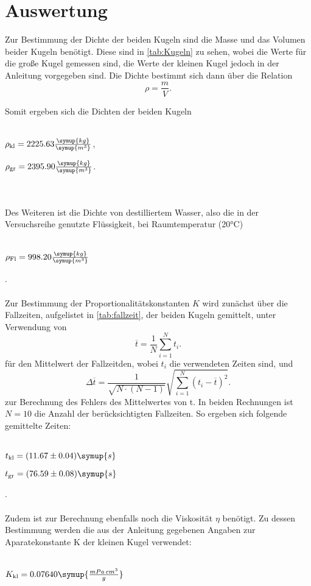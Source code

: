 \section{Auswertung}
\label{sec:Auswertung}
Zur Bestimmung der Dichte der beiden Kugeln sind die Masse und das Volumen beider Kugeln benötigt. Diese sind in \autoref{tab:Kugeln}
zu sehen, wobei die Werte für die große Kugel gemessen sind, die Werte der kleinen Kugel jedoch in der Anleitung \cite{V207} vorgegeben sind.
 Die Dichte bestimmt sich dann über die Relation
\begin{equation}
\rho = \frac{m}{V}.
\end{equation}

Somit ergeben sich die Dichten der beiden Kugeln
\\ \\
\centerline{$\rho_\text{kl} = 2225.63 \frac{\symup{kg}}{\symup{m^3}}$,}
\centerline{$\rho_\text{gr} = 2395.90 \frac{\symup{kg}}{\symup{m^3}}$.}
\\ \\

Des Weiteren ist die Dichte von destilliertem Wasser, also die in der Versuchsreihe genutzte Flüssigkeit, bei Raumtemperatur (20°C) \cite{science}
\\ \\
\centerline{$\rho_\text{Fl} = 998.20 \frac{\symup{kg}}{\symup{m^3}}$}.
\\ \\

Zur Bestimmung der Proportionalitätskonstanten $K$ wird zunächst über die Fallzeiten, aufgelistet in \autoref{tab:fallzeit}, 
der beiden Kugeln gemittelt, unter Verwendung von 
\begin{equation}
\label{eqn:mittelwert}
\overline{t} = \frac {1} {N} \sum_{i=1}^{N} t_i.
\end{equation}
für den Mittelwert der Fallzeitden, wobei $t_i$ die verwendeten Zeiten sind, und 
\begin{equation}
\label{eqn:FehlerMittelwert}
\Delta \overline{t} = \frac{1}{\sqrt{N \cdot (N-1)}} \sqrt{ \sum_{i=1}^N (t_i - \overline{t})^2}.
\end{equation}
zur Berechnung des Fehlers des Mittelwertes von t. In beiden Rechnungen ist $N = 10$ die Anzahl der berücksichtigten Fallzeiten.
So ergeben sich folgende gemittelte Zeiten:
\\ \\
\centerline{$t_\text{kl} = (11.67 \pm 0.04) \symup{s}$}

\centerline{$t_\text{gr} = (76.59 \pm 0.08) \symup{s}$}.
\\ \\
 
Zudem ist zur Berechnung ebenfalls noch die Viskosität $\eta$ benötigt. Zu dessen Bestimmung werden die aus der Anleitung \cite{V207} gegebenen Angaben zur Aparatekonstante K der kleinen Kugel verwendet:
\\ \\
\centerline{$K_\text{kl} = 0.07640 \symup{\frac{mPa \, cm^3}{g}}$}
\\ \\

